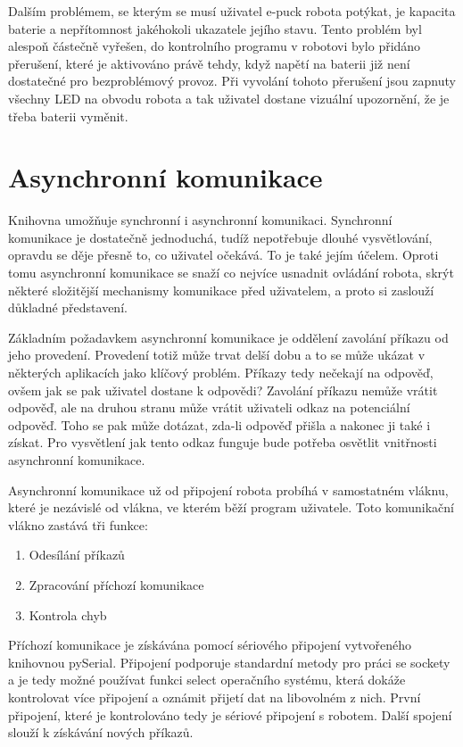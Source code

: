 \documentclass[12pt,notitlepage]{report}
\begin{document}
    Dalším problémem, se kterým se musí uživatel e-puck robota potýkat, je
    kapacita baterie a nepřítomnost jakéhokoli ukazatele jejího stavu. Tento
    problém byl alespoň částečně vyřešen, do kontrolního programu v robotovi
    bylo přidáno přerušení, které je aktivováno právě tehdy, když napětí na
    baterii již není dostatečné pro bezproblémový provoz. Při vyvolání tohoto
    přerušení jsou zapnuty všechny LED na obvodu robota a tak uživatel dostane
    vizuální upozornění, že je třeba baterii vyměnit.

    \section{Asynchronní komunikace}
    \label{async-impl}

    Knihovna umožňuje synchronní i asynchronní komunikaci. Synchronní
    komunikace je dostatečně jednoduchá, tudíž nepotřebuje dlouhé vysvětlování,
    opravdu se děje přesně to, co uživatel očekává. To je také jejím účelem.
    Oproti tomu asynchronní komunikace se snaží co nejvíce usnadnit ovládání
    robota, skrýt některé složitější mechanismy komunikace před uživatelem, a
    proto si zaslouží důkladné představení.

    Základním požadavkem asynchronní komunikace je oddělení zavolání příkazu od
    jeho provedení. Provedení totiž může trvat delší dobu a to se může ukázat v
    některých aplikacích jako klíčový problém. Příkazy tedy nečekají na
    odpověď, ovšem jak se pak uživatel dostane k odpovědi? Zavolání příkazu
    nemůže vrátit odpověď, ale na druhou stranu může vrátit uživateli odkaz na
    potenciální odpověď. Toho se pak může dotázat, zda-li odpověď přišla a
    nakonec ji také i získat. Pro vysvětlení jak tento odkaz funguje bude
    potřeba osvětlit vnitřnosti asynchronní komunikace.

    Asynchronní komunikace už od připojení robota probíhá v samostatném vláknu,
    které je nezávislé od vlákna, ve kterém běží program uživatele. Toto
    komunikační vlákno zastává tři funkce:

    \begin{enumerate}
        \item Odesílání příkazů
        \item Zpracování příchozí komunikace
        \item Kontrola chyb
    \end{enumerate}

    Příchozí komunikace je získávána pomocí sériového připojení vytvořeného
    knihovnou pySerial. Připojení podporuje standardní metody pro práci se
    sockety a je tedy možné používat funkci select operačního systému, která
    dokáže kontrolovat více připojení a oznámit přijetí dat na libovolném z
    nich. První připojení, které je kontrolováno tedy je sériové připojení s
    robotem. Další spojení slouží k získávání nových příkazů.
\end{document}
